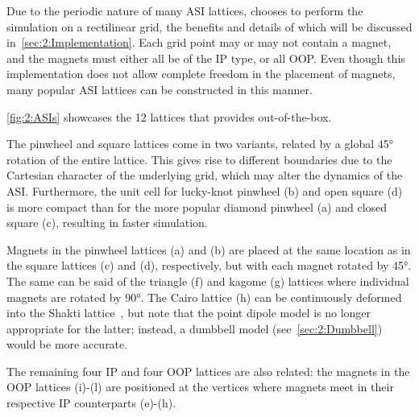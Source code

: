 Due to the periodic nature of many ASI lattices, \hotspice chooses to perform the simulation on a rectilinear grid, the benefits and details of which will be discussed in~\cref{sec:2:Implementation}.
Each grid point may or may not contain a magnet, and the magnets must either all be of the IP type, or all OOP.
Even though this implementation does not allow complete freedom in the placement of magnets, many popular ASI lattices can be constructed in this manner. \par


\cref{fig:2:ASIs} showcases the 12 lattices that \hotspice provides out-of-the-box. \par
The pinwheel and square lattices come in two variants, related by a global \ang{45} rotation of the entire lattice.
This gives rise to different boundaries due to the Cartesian character of the underlying grid, which may alter the dynamics of the ASI.
Furthermore, the unit cell for lucky-knot pinwheel (b) and open square (d) is more compact than for the more popular diamond pinwheel (a) and closed square (c), resulting in faster simulation. \par %
Magnets in the pinwheel lattices (a) and (b) are placed at the same location as in the square lattices (c) and (d), respectively, but with each magnet rotated by \ang{45}.
The same can be said of the triangle (f) and kagome (g) lattices where individual magnets are rotated by \ang{90}.
The Cairo lattice (h) can be continuously deformed into the Shakti lattice~\cite{ShaktiCairo}, but note that the point dipole model is no longer appropriate for the latter; instead, a dumbbell model (see~\cref{sec:2:Dumbbell}) would be more accurate. \par
The remaining four IP and four OOP lattices are also related: the magnets in the OOP lattices (i)-(l) are positioned at the vertices where magnets meet in their respective IP counterparts (e)-(h).

